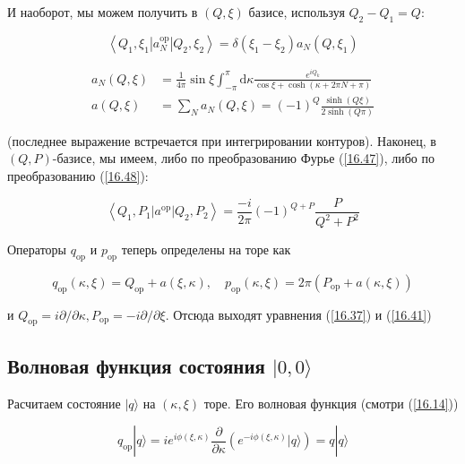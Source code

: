 \documentclass[main.tex]{subfiles}
\begin{document}
И наоборот, мы можем получить в $(Q, \xi)$ базисе, используя $Q_{2}-Q_{1}=Q:$ 

\begin{equation}
\left\langle Q_{1}, \xi_{1}\left|a_{N}^{\mathrm{op}}\right| Q_{2}, \xi_{2}\right\rangle=\delta\left(\xi_{1}-\xi_{2}\right) a_{N}\left(Q, \xi_{1}\right)
\end{equation}

\begin{equation}\label{16.48} 
\begin{aligned}
a_{N}(Q, \xi) &=\frac{1}{4 \pi} \sin \xi \int_{-\pi}^{\pi} \mathrm{d} \kappa \frac{e^{i Q_{k}}}{\cos \xi+\cosh (\kappa+2 \pi N+\pi)} \\
a(Q, \xi) &=\sum_{N} a_{N}(Q, \xi)=(-1)^{Q} \frac{\sinh (Q \xi)}{2 \sinh (Q \pi)}
\end{aligned}
\end{equation}

(последнее выражение встречается при интегрировании контуров). Наконец, в $(Q, P)$-базисе, мы имеем, либо по преобразованию Фурье (\ref{16.47}), либо по преобразованию (\ref{16.48}):

\begin{equation}\label{16.49} 
\left\langle Q_{1}, P_{1}\left|a^{\mathrm{op}}\right| Q_{2}, P_{2}\right\rangle=\frac{-i}{2 \pi}(-1)^{Q+P} \frac{P}{Q^{2}+P^{2}}
\end{equation}

Операторы $q_{\mathrm{op}}$ и $p_{\mathrm{op}}$ теперь определены на торе как

\begin{equation}\label{16.50} 
q_{\mathrm{op}}(\kappa, \xi)=Q_{\mathrm{op}}+a(\xi, \kappa), \quad p_{\mathrm{op}}(\kappa, \xi)=2 \pi\left(P_{\mathrm{op}}+a(\kappa, \xi)\right)
\end{equation}

и $Q_{\mathrm{op}}=i \partial / \partial \kappa, P_{\mathrm{op}}=-i \partial / \partial \xi .$ Отсюда выходят уравнения (\ref{16.37}) и (\ref{16.41})



\subsection{Волновая функция состояния $|0, 0\rangle$}\label{ch16.4}

Расчитаем состояние $|q\rangle$ на $(\kappa, \xi)$ торе. Его волновая функция (смотри (\ref{16.14}))

\begin{equation}\label{16.51} 
q_{\mathrm{op}}|q\rangle= i e^{i \phi(\xi, \kappa)} \frac{\partial}{\partial \kappa}\left(e^{-i \phi(\xi, \kappa)}|q\rangle\right)=q|q\rangle
\end{equation}
\end{document}
